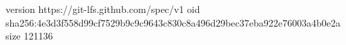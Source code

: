 version https://git-lfs.github.com/spec/v1
oid sha256:4e3d3f558d99cf7529b9c9c9643c830c8a496d29bec37eba922e76003a4b0e2a
size 121136
